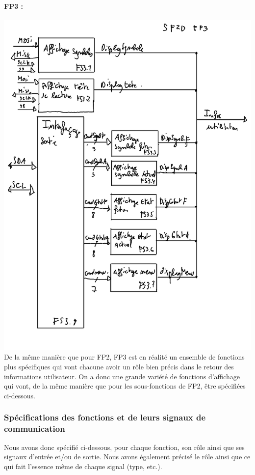 \documentclass[12pt]{article}
\begin{document}
	\paragraph{FP3 :}
	\includegraphics[width=\textwidth]{img/SF2DFP3}
	De la même manière que pour FP2, FP3 est en réalité un ensemble de fonctions plus spécifiques qui vont chacune avoir un rôle bien précis dans le retour des informations utilisateur. On a donc une grande variété de fonctions d'affichage qui vont, de la même manière que pour les sous-fonctions de FP2, être spécifiées ci-dessous.
	\subsubsection{Spécifications des fonctions et de leurs signaux de communication}
	Nous avons donc spécifié ci-dessous, pour chaque fonction, son rôle ainsi que ses signaux d'entrée et/ou de sortie. Nous avons également précisé le rôle ainsi que ce qui fait l'essence même de chaque signal (type, etc.).
	
\end{document}
